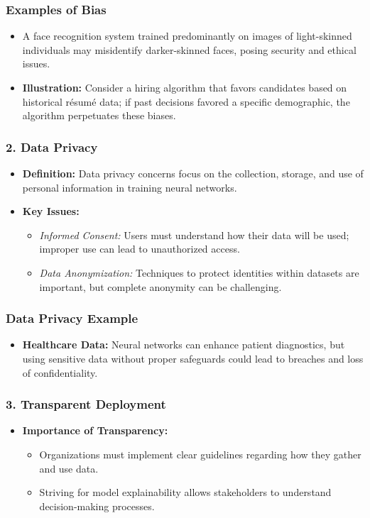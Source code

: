 \documentclass[aspectratio=169]{beamer}
\begin{document}
\begin{frame}[fragile]
    \frametitle{Examples of Bias}
    \begin{itemize}
        \item A face recognition system trained predominantly on images of light-skinned individuals may misidentify darker-skinned faces, posing security and ethical issues.
        \item \textbf{Illustration:} Consider a hiring algorithm that favors candidates based on historical résumé data; if past decisions favored a specific demographic, the algorithm perpetuates these biases.
    \end{itemize}
\end{frame}

\begin{frame}[fragile]
    \frametitle{2. Data Privacy}
    \begin{itemize}
        \item \textbf{Definition:} Data privacy concerns focus on the collection, storage, and use of personal information in training neural networks.
        \item \textbf{Key Issues:}
        \begin{itemize}
            \item \textit{Informed Consent:} Users must understand how their data will be used; improper use can lead to unauthorized access.
            \item \textit{Data Anonymization:} Techniques to protect identities within datasets are important, but complete anonymity can be challenging.
        \end{itemize}
    \end{itemize}
\end{frame}

\begin{frame}[fragile]
    \frametitle{Data Privacy Example}
    \begin{itemize}
        \item \textbf{Healthcare Data:} Neural networks can enhance patient diagnostics, but using sensitive data without proper safeguards could lead to breaches and loss of confidentiality.
    \end{itemize}
\end{frame}

\begin{frame}[fragile]
    \frametitle{3. Transparent Deployment}
    \begin{itemize}
        \item \textbf{Importance of Transparency:}
        \begin{itemize}
            \item Organizations must implement clear guidelines regarding how they gather and use data.
            \item Striving for model explainability allows stakeholders to understand decision-making processes.
        \end{itemize}
    \end{itemize}
\end{frame}
\end{document}
